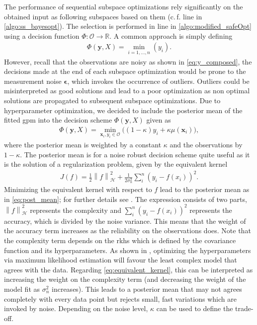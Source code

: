 \documentclass{ifacconf}
\newcounter{part}
\newcommand{\cf}{c.\,f. }
\newcommand{\linea}[1]{line\:{\footnotesize \textbf{(#1)}}}
\newcommand{\norm}[1]{\left\lVert#1\right\rVert}
\newcommand{\bx}{\bm{x}}
\begin{document}
The performance of sequential subspace optimizations rely significantly on the obtained input as following subspaces based on them (\cf \linea{3} in \cref{algo:ss_bayesopt}). The selection is performed in \linea{18} in \cref{algo:modified_safeOpt} using a decision function \(\Phi:\mathcal{O}\rightarrow \mathbb{R}\). A common approach is simply defining
\begin{align}
        \Phi(\bm{y},X)= \min_{i=1,\dots,n}(y_i).
        \label{eq:bad_descision_scheme}
\end{align}
However, recall that the observations are noisy as shown in \eqref{eq:y_composed}, the decisions made at the end of each subspace optimization would be prone to the measurement noise \(\bm{\epsilon}\), which invokes the occurrence of outliers. Outliers could be misinterpreted as good solutions and lead to a poor optimization as non optimal solutions are propagated to subsequent subspace optimizations.
Due to hyperparameter optimization, we decided to include the posterior mean of the fitted \gls{gpm} into the decision scheme \(\Phi(\bm{y},X)\) given as 
\begin{align}
    \Phi(\bm{y},X)=\min\limits_{\bm{x}_i, y_i\in \mathcal{O}}\big((1-\kappa)y_i+\kappa\mu(\bx_i)\big),
    \label{eq:new_decision_scheme}
\end{align}
where the posterior mean is weighted by a constant \(\kappa\) and the observations by \(1-\kappa\). The posterior mean is for a noise robust decision scheme quite useful as it is the solution of a regularization problem, given by the equivalent kernel 
\begin{align}
    J(f)= \frac{1}{2}\norm{f}_\mathcal{H}^2 + \frac{1}{2\sigma_n^2}\sum_i^n(y_i-f(x_i))^2.
    \label{eq:equivalent_kernel}
\end{align} 
Minimizing the equivalent kernel with respect to \(f\) lead to the posterior mean as in \eqref{eq:post_mean}; for further details see \cite{williams2006gaussian}.
The expression consists of two parts, \(\norm{f}_\mathcal{H}^2 \) represents the complexity and \(\sum_i^n(y_i-f(x_i))^2\) represents the accuracy, which is divided by the noise variance. This means that the weight of the accuracy term increases as the reliability on the observations does. Note that the complexity term depends on the \gls{rkhs} which is defined by the covariance function and its hyperparameters. As shown in \cite{williams2006gaussian}, optimizing the hyperparameters via maximum likelihood estimation will favour the least complex model that agrees with the data. Regarding \eqref{eq:equivalent_kernel}, this can be interpreted as increasing the weight on the complexity term (and decreasing the weight of the model fit as \(\sigma_n^2\) increases). This leads to a posterior mean that may not agrees completely with every data point but rejects small, fast variations which are invoked by noise. Depending on the noise level, \(\kappa\) can be used to define the trade-off. 
\end{document}
